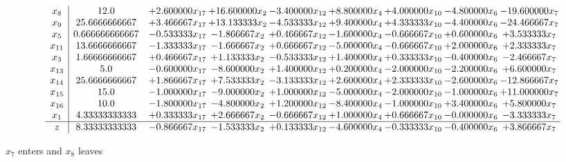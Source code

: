\documentclass[10pt]{article}
\begin{document}
 \[\begin{array}{c| c c@{\hskip 2pt} c@{\hskip 2pt} c@{\hskip 2pt} c@{\hskip 2pt} c@{\hskip 2pt} c@{\hskip 2pt} c@{\hskip 2pt} }
 x_{8}   &  12.0 & + 2.600000 x_{17} & + 16.600000 x_{2} & -3.400000 x_{12} & + 8.800000 x_{4} & + 4.000000 x_{10} & -4.800000 x_{6} & -19.600000 x_{7}\\
 x_{9}   &  25.6666666667 & + 3.466667 x_{17} & + 13.133333 x_{2} & -4.533333 x_{12} & + 9.400000 x_{4} & + 4.333333 x_{10} & -4.400000 x_{6} & -24.466667 x_{7}\\
 x_{5}   &  0.666666666667 & -0.533333 x_{17} & -1.866667 x_{2} & + 0.466667 x_{12} & -1.600000 x_{4} & -0.666667 x_{10} & + 0.600000 x_{6} & + 3.533333 x_{7}\\
 x_{11}   &  13.6666666667 & -1.333333 x_{17} & -1.666667 x_{2} & + 0.666667 x_{12} & -5.000000 x_{4} & -0.666667 x_{10} & + 2.000000 x_{6} & + 2.333333 x_{7}\\
 x_{3}   &  1.66666666667 & + 0.466667 x_{17} & + 1.133333 x_{2} & -0.533333 x_{12} & + 1.400000 x_{4} & + 0.333333 x_{10} & -0.400000 x_{6} & -2.466667 x_{7}\\
 x_{13}   &  5.0 & -0.600000 x_{17} & -8.600000 x_{2} & + 1.400000 x_{12} & + 0.200000 x_{4} & -2.000000 x_{10} & -2.200000 x_{6} & + 6.600000 x_{7}\\
 x_{14}   &  25.6666666667 & + 1.866667 x_{17} & + 7.533333 x_{2} & -3.133333 x_{12} & + 2.600000 x_{4} & + 2.333333 x_{10} & -2.600000 x_{6} & -12.866667 x_{7}\\
 x_{15}   &  15.0 & -1.000000 x_{17} & -9.000000 x_{2} & + 1.000000 x_{12} & -5.000000 x_{4} & -2.000000 x_{10} & -1.000000 x_{6} & + 11.000000 x_{7}\\
 x_{16}   &  10.0 & -1.800000 x_{17} & -4.800000 x_{2} & + 1.200000 x_{12} & -8.400000 x_{4} & -1.000000 x_{10} & + 3.400000 x_{6} & + 5.800000 x_{7}\\
 x_{1}   &  4.33333333333 & + 0.333333 x_{17} & + 2.666667 x_{2} & -0.666667 x_{12} & + 1.000000 x_{4} & + 0.666667 x_{10} & -0.000000 x_{6} & -3.333333 x_{7}\\
\hline
z    &  8.33333333333 & -0.866667 x_{17} & -1.533333 x_{2} & + 0.133333 x_{12} & -4.600000 x_{4} & -0.333333 x_{10} & -0.400000 x_{6} & + 3.866667 x_{7}\\
\end{array}\]


 $ x_{7} $ enters and $ x_{8} $ leaves 
\end{document}
